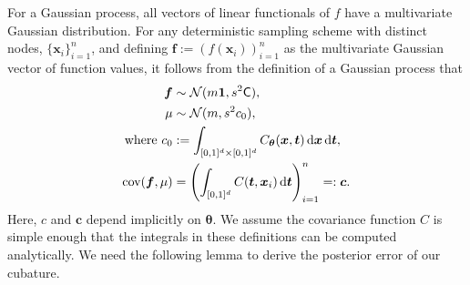 \documentclass{iitthesis}          %
\newcommand{\bm}[1]{\boldsymbol{#1}}
\newcommand{\dif}[1]{\text{d}{#1}}
\newcommand{\D}[1]{\text{d}{#1}}
\newcommand{\vtheta}{{\bm{\theta}}}
\newcommand{\vc}{\bm{c}}
\newcommand{\vf}{\bm{f}}
\newcommand{\vt}{\bm{t}}
\newcommand{\vx}{\bm{x}}
\newcommand{\vone}{\bm{1}}
\newcommand{\mC}{\mathsf{C}}
\newcommand{\cov}{{\textup{cov}}}
\newcommand{\calN}{\mathcal{N}}
\begin{document}
For a Gaussian process, all vectors of linear functionals of $f$ have a multivariate Gaussian distribution. 
For any deterministic sampling scheme with distinct nodes, $\{\vx_i\}_{i=1}^n$, and defining  $\vf  := \left( f(\vx_i)\right)_{i=1}^n$ as the multivariate Gaussian vector of function values, it follows from the definition of a Gaussian process that 
\begin{subequations} \label{eqn:fGaussDist}
\begin{align}
\vf  & \sim \calN(m \vone, s^2 \mC), \\
\mu & \sim \calN(m, s^2 c_0), 
\\
\text{where }
c_0 &:= \int_{[0,1]^{d} \times [0,1]^{d}} C_\vtheta(\vx,\vt) \, \dif{\vx} \, \dif{\vt}, \\
\cov(\vf, \mu) &= \left(  \int_{[0,1]^d} C(\vt,\vx_i) \, \D \vt \right)_{i=1}^n  =: \vc.
\end{align}
\end{subequations}
Here, $c$ and $\vc$ depend implicitly on $\vtheta$.  We assume the covariance function $C$ is simple enough that the integrals in these definitions can be computed analytically.
We need the following lemma to derive the posterior error of our cubature. 
\end{document}
